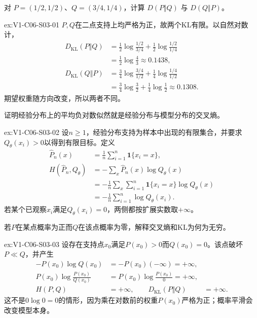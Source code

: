\begin{SLChapterExercisePairSection}
\begin{exercise}\label{ex:V1-C06-S03-01}
对 $P=(1/2,1/2)$、$Q=(3/4,1/4)$，计算 $D(P\Vert Q)$ 与 $D(Q\Vert P)$。
\end{exercise}
\label{sol:V1-C06-S03-01}
\begin{chapterexercisesolution}{ex:V1-C06-S03-01}
$P,Q$在二点支持上均严格为正，故两个KL有限。以自然对数计，
\[
\begin{aligned}
D_{\mathrm{KL}}(P\Vert Q)
&=\frac12\log\frac{1/2}{3/4}
+\frac12\log\frac{1/2}{1/4}\\
&=\frac12\log\frac43\approx0.1438,\\
D_{\mathrm{KL}}(Q\Vert P)
&=\frac34\log\frac{3/4}{1/2}
+\frac14\log\frac{1/4}{1/2}\\
&=\frac34\log\frac32+\frac14\log\frac12
\approx0.1308.
\end{aligned}
\]
期望权重随方向改变，所以两者不同。
\end{chapterexercisesolution}

\begin{exercise}\label{ex:V1-C06-S03-02}
证明经验分布上的平均负对数似然就是经验分布与模型分布的交叉熵。
\end{exercise}
\label{sol:V1-C06-S03-02}
\begin{chapterexercisesolution}{ex:V1-C06-S03-02}
设$n\ge1$，经验分布支持为样本中出现的有限集合，并要求$Q_\theta(x_i)>0$以得到有限目标。定义
\[
\begin{aligned}
\widehat P_n(x)&=\frac1n\sum_{i=1}^n\mathbf1\{x_i=x\},\\
H(\widehat P_n,Q_\theta)
&=-\sum_x\widehat P_n(x)\log Q_\theta(x)\\
&=-\frac1n\sum_x\sum_{i=1}^n
\mathbf1\{x_i=x\}\log Q_\theta(x)\\
&=-\frac1n\sum_{i=1}^n\log Q_\theta(x_i).
\end{aligned}
\]
若某个已观察$x_i$满足$Q_\theta(x_i)=0$，两侧都按扩展实数取$+\infty$。
\end{chapterexercisesolution}

\begin{exercise}\label{ex:V1-C06-S03-03}
若$P$在某点概率为正而$Q$在该点概率为零，解释交叉熵和KL为何为无穷。
\end{exercise}
\label{sol:V1-C06-S03-03}
\begin{chapterexercisesolution}{ex:V1-C06-S03-03}
设存在支持点$x_0$满足$P(x_0)>0$而$Q(x_0)=0$。该点破坏$P\ll Q$，并产生
\[
\begin{aligned}
-P(x_0)\log Q(x_0)
&=-P(x_0)(-\infty)=+\infty,\\
P(x_0)\log\frac{P(x_0)}{Q(x_0)}
&=P(x_0)\log\frac{P(x_0)}0=+\infty,\\
H(P,Q)&=+\infty,\qquad
D_{\mathrm{KL}}(P\Vert Q)&=+\infty.
\end{aligned}
\]
这不是$0\log0=0$的情形，因为乘在对数前的权重$P(x_0)$严格为正；概率平滑会改变模型本身。
\end{chapterexercisesolution}


\end{SLChapterExercisePairSection}
